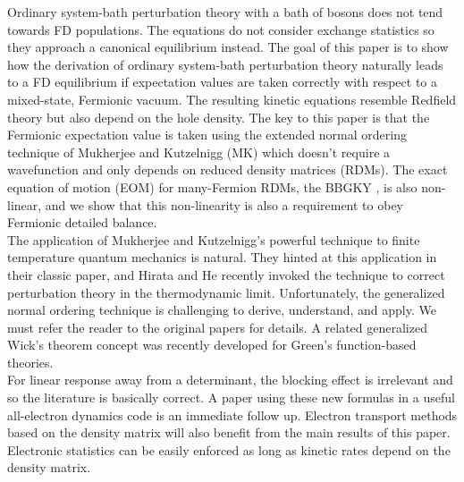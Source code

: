 \documentclass[aip,jcp,preprint,floatfix]{revtex4-1}
\begin{document}
{\indent     Ordinary system-bath perturbation theory with a bath of bosons does not tend towards FD populations. The equations do not consider exchange statistics so they approach a canonical equilibrium instead. The goal of this paper is to show how the derivation of ordinary system-bath perturbation theory naturally leads to a FD equilibrium if expectation values are taken correctly with respect to a mixed-state, Fermionic vacuum. The resulting kinetic equations resemble Redfield theory\cite{redfield} but also depend on the hole density. The key to this paper is that the Fermionic expectation value is taken using the extended normal ordering technique of Mukherjee and Kutzelnigg (MK) \cite{Kutzelnigg:1997aa} which doesn't require a wavefunction and only depends on reduced density matrices (RDMs). The exact equation of motion (EOM) for many-Fermion RDMs, the BBGKY \cite{PhysRevB.85.235121}, is also non-linear, and we show that this non-linearity is also a requirement to obey Fermionic detailed balance. \\
\indent     The application of Mukherjee and Kutzelnigg's powerful technique to finite temperature quantum mechanics is natural. They hinted at this application in their classic paper, and Hirata and He recently invoked the technique to correct perturbation theory in the thermodynamic limit\cite{Hirata:KohnLutt}. Unfortunately, the generalized normal ordering technique is challenging to derive, understand, and apply. We must refer the reader to the original papers for details. A related generalized Wick's theorem\cite{orig_Wick} concept was recently developed for Green's function-based theories\cite{PhysRevB.85.115119}. \\
\indent    For linear response away from a determinant, the blocking effect is irrelevant\cite{Tempel:2011aa} and so the literature is basically correct. A paper using these new formulas in a useful all-electron dynamics code is an immediate follow up. Electron transport methods based on the density matrix will also benefit from the main results of this paper\cite{Zelovich:2014kq,Chen:2014fj,Subotnik:2009aa,ThossKinetics}. Electronic statistics can be easily enforced as long as kinetic rates depend on the density matrix. 

}
\end{document}
